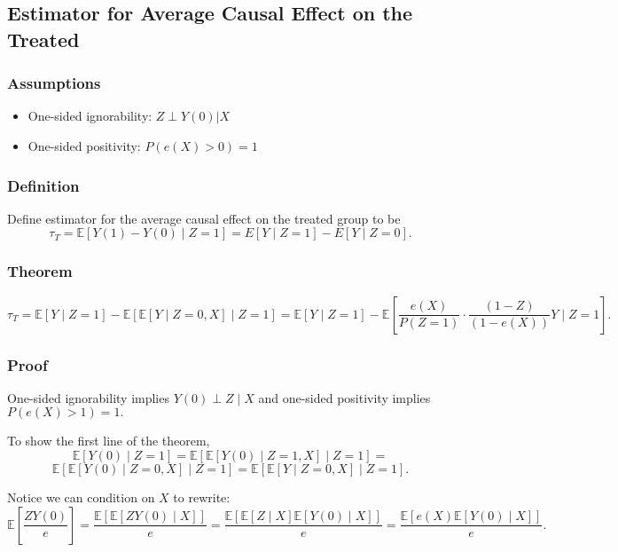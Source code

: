 \subsection{Estimator for Average Causal Effect on the Treated}

\subsubsection{Assumptions}

\begin{itemize}
    \item One-sided ignorability: $Z \perp Y(0) | X$
    \item One-sided positivity: $P(e(X) > 0) = 1$
\end{itemize}

\subsubsection{Definition}

Define estimator for the average causal effect on the treated group to be $$\tau_{T} = \mathbb{E}[Y(1) - Y(0) \mid Z = 1] = E[Y \mid Z = 1] - E[Y \mid Z = 0].$$

\subsubsection{Theorem}

$$\tau_T = \mathbb{E}[Y \mid Z = 1] - \mathbb{E}[\mathbb{E}[Y \mid Z = 0, X] \mid Z = 1] = \mathbb{E}[Y \mid Z = 1] - \mathbb{E}\left[\frac{e(X)}{P(Z=1)} \cdot \frac{(1-Z)}{(1-e(X))} Y \mid Z = 1\right].$$

\subsubsection{Proof}

One-sided ignorability implies $Y(0) \perp Z \mid X$ and one-sided positivity implies $P(e(X) > 1) = 1.$

\noindent To show the first line of the theorem, $$\mathbb{E}[Y(0) \mid Z = 1] = \mathbb{E}[\mathbb{E}[Y(0) \mid Z = 1, X] \mid Z = 1] = $$
$$\mathbb{E}[\mathbb{E}[Y(0) \mid Z = 0, X] \mid Z = 1] = \mathbb{E}[\mathbb{E}[Y \mid Z = 0, X] \mid Z = 1].$$

\noindent Notice we can condition on $X$ to rewrite: 
$$\mathbb{E}\left[\frac{ZY(0)}{e}\right] = \frac{\mathbb{E}\left[\mathbb{E}[ZY(0) \mid X]\right]}{e} = \frac{\mathbb{E}\left[\mathbb{E}[Z \mid X]\mathbb{E}[Y(0) \mid X]\right]}{e} = \frac{\mathbb{E}\left[e(X)\mathbb{E}[Y(0) \mid X]\right]}{e}.$$

